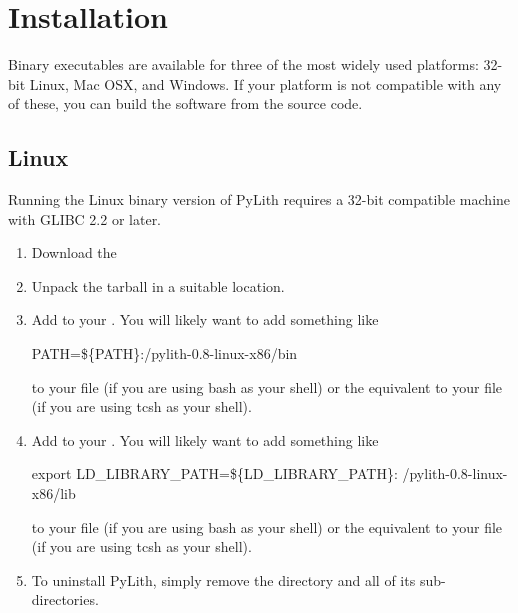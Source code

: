 \section{Installation}

Binary executables are available for three of the most widely used
platforms: 32-bit Linux, Mac OSX, and Windows. If your platform is not
compatible with any of these, you can build the software from the
source code.

\subsection{Linux}

Running the Linux binary version of PyLith requires a 32-bit
compatible machine with GLIBC 2.2 or later.

\begin{enumerate}
\item Download the 
\item Unpack the tarball in a suitable location.
  \begin{screen}
  \end{screen}
\item Add  to your .
  You will likely want to add something like
  \begin{screen}
    PATH=\$\{PATH\}:/pylith-0.8-linux-x86/bin
  \end{screen}
  to your  file (if you are using bash as your shell)
  or the equivalent to your  file (if you are using
  tcsh as your shell).
\item Add to your
  . You will likely want to add something like
  \begin{screen}
    export LD\_LIBRARY\_PATH=\$\{LD\_LIBRARY\_PATH\}:
    /pylith-0.8-linux-x86/lib
  \end{screen}
  to your  file (if you are using bash as your
  shell) or the equivalent to your  file
  (if you are using tcsh as your shell).
\item To uninstall PyLith, simply remove the 
  directory and all of its sub-directories.
\end{enumerate}

